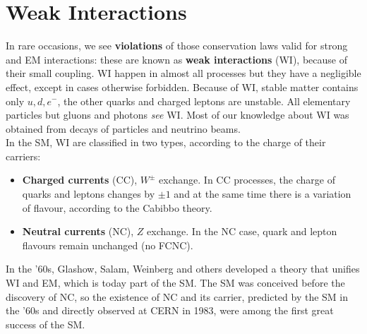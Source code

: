 \documentclass[10.75pt,a4paper,openright,bottom=2cm]{article}
\begin{document}
\section{Weak Interactions}
In rare occasions, we see \textbf{violations} of those conservation laws valid for strong and EM interactions: these are known as \textbf{weak interactions} (WI), because of their small coupling. WI happen in almost all processes but they have a negligible effect, except in cases otherwise forbidden. Because of WI, stable matter contains only $u,d,e^-$, the other quarks and charged leptons are unstable. All elementary particles but gluons and photons \textit{see} WI. Most of our knowledge about WI was obtained from decays of particles and neutrino beams.\\
In the SM, WI are classified in two types, according to the charge of their carriers:
\begin{itemize}
    \item \textbf{Charged currents} (CC), $W^\pm$ exchange. In CC processes, the charge of quarks and leptons changes by $\pm1$ and at the same time there is a variation of flavour, according to the Cabibbo theory.
    \item \textbf{Neutral currents} (NC), $Z$ exchange. In the NC case, quark and lepton flavours remain unchanged (no FCNC).
\end{itemize}
In the '60s, Glashow, Salam, Weinberg and others developed a theory that unifies WI and EM, which is today part of the SM. The SM was conceived before the discovery of NC, so the existence of NC and its carrier, predicted by the SM in the '60s and directly observed at CERN in 1983, were among the first great success of the SM.
\end{document}
